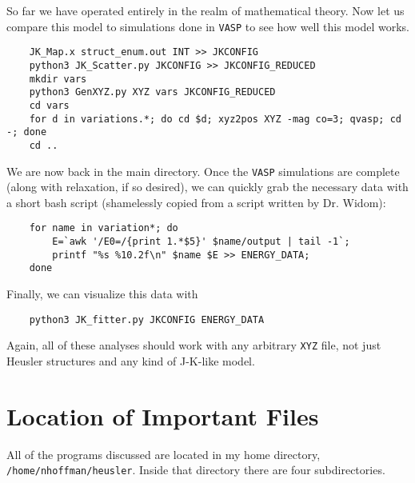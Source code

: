 \documentclass[12pt]{article}
\begin{document}
So far we have operated entirely in the realm of mathematical theory. Now let us compare this model to simulations done in \texttt{VASP} to see how well this model works.

\begin{verbatim}
    JK_Map.x struct_enum.out INT >> JKCONFIG
    python3 JK_Scatter.py JKCONFIG >> JKCONFIG_REDUCED
    mkdir vars
    python3 GenXYZ.py XYZ vars JKCONFIG_REDUCED
    cd vars
    for d in variations.*; do cd $d; xyz2pos XYZ -mag co=3; qvasp; cd -; done
    cd ..
\end{verbatim}

We are now back in the main directory. Once the \texttt{VASP} simulations are complete (along with relaxation, if so desired), we can quickly grab the necessary data with a short bash script (shamelessly copied from a script written by Dr. Widom):
\begin{verbatim}
    for name in variation*; do
        E=`awk '/E0=/{print 1.*$5}' $name/output | tail -1`;
        printf "%s %10.2f\n" $name $E >> ENERGY_DATA;
    done
\end{verbatim}
Finally, we can visualize this data with
\begin{verbatim}
    python3 JK_fitter.py JKCONFIG ENERGY_DATA
\end{verbatim}

Again, all of these analyses should work with any arbitrary \texttt{XYZ} file, not just Heusler structures and any kind of J-K-like model.

\section{Location of Important Files}

All of the programs discussed are located in my home directory, \texttt{/home/nhoffman/heusler}. Inside that directory there are four subdirectories.
\end{document}

